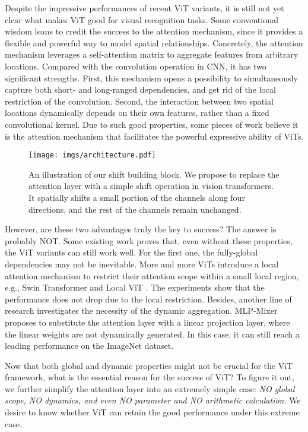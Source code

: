 \documentclass[letterpaper]{article} \usepackage{aaai22}  \usepackage{times}  \usepackage{helvet}  \usepackage{courier}  \usepackage[hyphens]{url}  \usepackage{graphicx} \usepackage{amsmath}
\begin{document}
Despite the impressive performances of recent ViT variants, it is still not yet clear what makes ViT good for visual recognition tasks. Some conventional wisdom leans to credit the success to the attention mechanism, since it provides a flexible and powerful way to model spatial relationships. Concretely, the attention mechanism leverages a self-attention matrix to aggregate features from arbitrary locations. Compared with the convolution operation in CNN, it has two significant strengths. First, this mechanism opens a possibility to simultaneously capture both short- and long-ranged dependencies, and get rid of the local restriction of the convolution. Second, the interaction between two spatial locations dynamically depends on their own features, rather than a fixed convolutional kernel. Due to such good properties, some pieces of work believe it is the attention mechanism that facilitates the powerful expressive ability of ViTs.

\begin{figure}[t]
\centering
\texttt{[image: imgs/architecture.pdf]}
\caption{An illustration of our shift building block. We propose to replace the attention layer with a simple shift operation in vision transformers. It spatially shifts a small portion of the channels along four directions, and the rest of the channels remain unchanged.}
\label{fig:architecture}
\end{figure}

However, are these two advantages truly the key to success? The answer is probably NOT. Some existing work proves that, even without these properties, the ViT variants can still work well. For the first one, the fully-global dependencies may not be inevitable. More and more ViTs introduce a local attention mechanism to restrict their attention scope within a small local region, e.g., Swin Transformer \cite{Swin} and Local ViT \cite{LocalGlobalTransformer}. The experiments show that the performance does not drop due to the local restriction. Besides, another line of research investigates the necessity of the dynamic aggregation. MLP-Mixer \cite{MLPMixer} proposes to substitute the attention layer with a linear projection layer, where the linear weights are not dynamically generated. In this case, it can still reach a leading performance on the ImageNet dataset.

Now that both global and dynamic properties might not be crucial for the ViT framework, what is the essential reason for the success of ViT? To figure it out, we further simplify the attention layer into an extremely simple case: \textit{NO global scope, NO dynamics, and even NO parameter and NO arithmetic calculation}. We desire to know whether ViT can retain the good performance under this extreme case.
\end{document}
